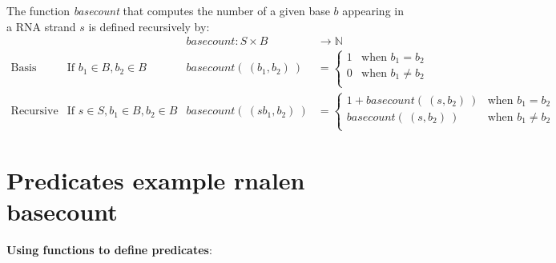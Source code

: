 \documentclass[12pt, oneside]{article}
\begin{document}
The function \textit{basecount} that computes the number of a given base 
$b$ appearing in a RNA strand $s$ is defined recursively by:
\[
\begin{array}{llll}
& & \textit{basecount} : S \times B & \to \mathbb{N} \\
\textrm{Basis Step:} &  \textrm{If } b_1 \in B, b_2 \in B & \textit{basecount}(~(b_1, b_2)~) & =
        \begin{cases}
            1 & \textrm{when } b_1 = b_2 \\
            0 & \textrm{when } b_1 \neq b_2 \\
        \end{cases} \\
\textrm{Recursive Step:} & \textrm{If } s \in S, b_1 \in B, b_2 \in B &\textit{basecount}(~(s b_1, b_2)~) & =
        \begin{cases}
            1 + \textit{basecount}(~(s, b_2)~) & \textrm{when } b_1 = b_2 \\
            \textit{basecount}(~(s, b_2)~) & \textrm{when } b_1 \neq b_2 \\
        \end{cases}
\end{array}
\] \vfill
\section*{Predicates example rnalen basecount}


{\bf Using functions to define predicates}:


\end{document}
